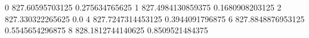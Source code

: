 0 827.60595703125 0.275634765625
1 827.4984130859375 0.1680908203125
2 827.330322265625 0.0
4 827.7247314453125 0.3944091796875
6 827.8848876953125 0.5545654296875
8 828.1812744140625 0.8509521484375
